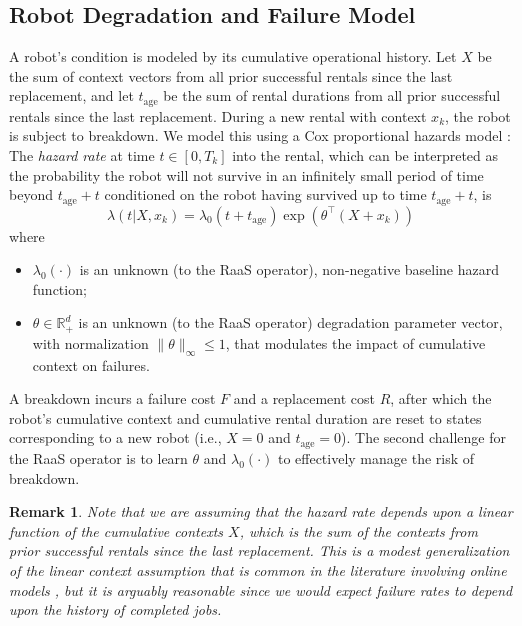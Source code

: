 \documentclass[conference]{IEEEtran}
\newtheorem{remark}{Remark}
\begin{document}
\subsection{Robot Degradation and Failure Model}
A robot's condition is modeled by its cumulative operational history. Let $X$ be the sum of context vectors from all prior successful rentals since the last replacement, and let $t_{\text{age}}$ be the sum of rental durations from all prior successful rentals since the last replacement. During a new rental with context $x_k$, the robot is subject to breakdown. We model this using a Cox proportional hazards model \cite{cox1972regression,kumar1994proportional}: The \emph{hazard rate} at time $t \in [0, T_k]$ into the rental, which can be interpreted as the probability the robot will not survive in an infinitely small period of time beyond $t_{\text{age}} + t$ conditioned on the robot having survived up to time $t_{\text{age}} + t$, is
\begin{equation}
    \lambda(t | X, x_k) = \lambda_0(t + t_{\text{age}}) \exp(\theta^\top (X + x_k))
\end{equation}
where
\begin{itemize}
    \item $\lambda_0(\cdot)$ is an unknown (to the RaaS operator), non-negative baseline hazard function;
    \item $\theta \in \mathbb{R}_+^d$ is an unknown (to the RaaS operator) degradation parameter vector, with normalization $\|\theta\|_\infty \leq 1$, that modulates the impact of cumulative context on failures.
\end{itemize}
A breakdown incurs a failure cost $F$ and a replacement cost $R$, after which the robot's cumulative context and cumulative rental duration are reset to states corresponding to a new robot (i.e., $X=0$ and $t_{\text{age}} = 0$). The second challenge for the RaaS operator is to learn $\theta$ and $\lambda_0(\cdot)$ to effectively manage the risk of breakdown.



\begin{remark}
    Note that we are assuming that the hazard rate depends upon a linear function of the cumulative contexts $X$, which is the sum of the contexts from prior successful rentals since the last replacement. This is a modest generalization of the linear context assumption that is common in the literature involving online models \cite{agrawal2013thompson,dimakopoulou2019balanced,bastani2021mostly}, but it is arguably reasonable since we would expect failure rates to depend upon the history of completed jobs.
    \end{remark}
\end{document}
